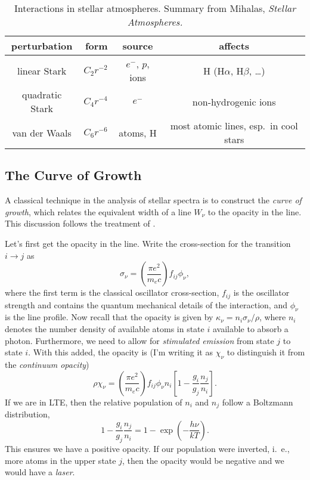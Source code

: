 \begin{table}[htbp]
\caption[Interactions in stellar atmospheres]{Interactions in stellar atmospheres. Summary from Mihalas, \emph{Stellar Atmospheres.}}\label{t.perturbers}
\begin{tabular}{crcc}
\hline
perturbation & form & source & affects\\
\hline\hline
linear Stark & $C_{2} r^{-2}$ & $e^{-}$, $p$, ions & H (H$\alpha$, H$\beta$, \ldots)\\
quadratic Stark & $C_{4} r^{-4}$ & $e^{-}$ & non-hydrogenic ions\\
van der Waals & $C_{6}r^{-6}$ & atoms, H & \parbox{120pt}{most atomic lines, esp.\ in cool stars}\\
\hline
\end{tabular}
\end{table}


\subsection{The Curve of Growth}

A classical technique in the analysis of stellar spectra is to construct the \emph{curve of growth}, which relates the equivalent width of a line $W_{\nu}$ to the opacity in the line. This discussion follows the treatment of \citet{Mihalas1978Stellar-Atmosph}.

Let's first get the opacity in the line.  Write the cross-section for the transition $i\to j$ as 
\[
\sigma_{\nu} = \left(\frac{\pi e^{2}}{m_{e}c}\right)f_{ij}\phi_{\nu},
\]
where the first term is the classical oscillator cross-section, $f_{ij}$ is the oscillator strength and contains the quantum mechanical details of the interaction, and $\phi_{\nu}$ is the line profile.  Now recall that the opacity is given by $\kappa_{\nu} = n_{i}\sigma_{\nu}/\rho$, where $n_{i}$ denotes the number density of available atoms in state $i$ available to absorb a photon.  Furthermore, we need to allow for \emph{stimulated emission} from state $j$ to state $i$. With this added, the opacity is (I'm writing it as $\chi_{\nu}$ to distinguish it from the \emph{continuum opacity})
\begin{equation}\label{e.opacity}
\rho\chi_{\nu} = \left(\frac{\pi e^{2}}{m_{e}c}\right)f_{ij}\phi_{\nu}n_{i}\left[1 - \frac{g_{i}}{g_{j}}\frac{n_{j}}{n_{i}}\right].
\end{equation}
If we are in LTE, then the relative population of $n_{i}$ and $n_{j}$ follow a Boltzmann distribution,
\[ 1 - \frac{g_{i}}{g_{j}}\frac{n_{j}}{n_{i}} = 1- \exp\left(-\frac{h\nu}{kT}\right). \]
This ensures we have a positive opacity. If our population were inverted, i.~e., more atoms in the upper state $j$, then the opacity would be negative and we would have a \emph{laser}.

